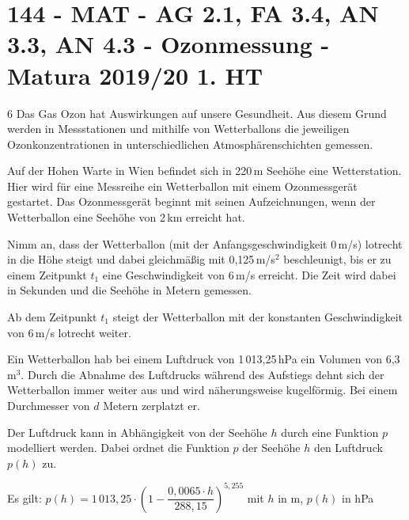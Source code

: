 \section{144 - MAT - AG 2.1, FA 3.4, AN 3.3, AN 4.3 - Ozonmessung - Matura 2019/20 1. HT}

\begin{langesbeispiel}\item[6] %
Das Gas Ozon hat Auswirkungen auf unsere Gesundheit. Aus diesem Grund werden in Messstationen und mithilfe von Wetterballons die jeweiligen Ozonkonzentrationen in unterschiedlichen Atmosphärenschichten gemessen.%

\begin{aufgabenstellung}
\item Auf der Hohen Warte in Wien befindet sich in 220\,m Seehöhe eine Wetterstation. Hier wird für eine Messreihe ein Wetterballon mit einem Ozonmessgerät gestartet. Das Ozonmessgerät beginnt mit seinen Aufzeichnungen, wenn der Wetterballon eine Seehöhe von 2\,km erreicht hat.

Nimm an, dass der Wetterballon (mit der Anfangsgeschwindigkeit 0\,m/s) lotrecht in die Höhe steigt und dabei gleichmäßig mit 0,125\,m/s$^2$ beschleunigt, bis er zu einem Zeitpunkt $t_1$ eine Geschwindigkeit von 6\,m/s erreicht. Die Zeit wird dabei in Sekunden und die Seehöhe in Metern gemessen.%


Ab dem Zeitpunkt $t_1$ steigt der Wetterballon mit der konstanten Geschwindigkeit von 6\,m/s lotrecht weiter.


\item Ein Wetterballon hab bei einem Luftdruck von 1\,013,25\,hPa ein Volumen von 6,3\,m$^3$. Durch die Abnahme des Luftdrucks während des Aufstiegs dehnt sich der Wetterballon immer weiter aus und wird näherungsweise kugelförmig. Bei einem Durchmesser von $d$ Metern zerplatzt er.

Der Luftdruck kann in Abhängigkeit von der Seehöhe $h$ durch eine Funktion $p$ modelliert werden. Dabei ordnet die Funktion $p$ der Seehöhe $h$ den Luftdruck $p(h)$ zu.

Es gilt: $p(h)=1\,013,25\cdot\left(1-\dfrac{0,0065\cdot h}{288,15}\right)^{5,255}$ mit $h$ in m, $p(h)$ in hPa


\end{aufgabenstellung}
\end{langesbeispiel}
